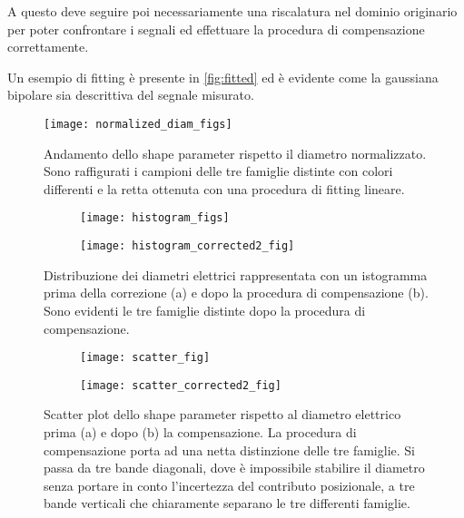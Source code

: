 A questo deve seguire poi necessariamente una riscalatura nel dominio originario per poter confrontare i segnali ed effettuare la procedura di compensazione correttamente.

Un esempio di fitting è presente in \cref{fig:fitted} ed è evidente come la gaussiana bipolare sia descrittiva del segnale misurato.

\begin{figure}[t!]
	\centering
	\texttt{[image: normalized\_diam\_figs]}
	\caption{Andamento dello shape parameter rispetto il diametro normalizzato. Sono raffigurati i campioni delle tre famiglie distinte con colori differenti e la retta ottenuta con una procedura di fitting lineare.}
	\label{fig:normalized}
\end{figure}

\begin{figure*}[t!]
	\centering
	\begin{subfigure}{0.5\linewidth}
		\centering
		\texttt{[image: histogram\_figs]}
		\caption{}
		\label{fig:histo}
	\end{subfigure}\hfill
	\begin{subfigure}{0.5\linewidth}
		\centering
		\texttt{[image: histogram\_corrected2\_fig]}
		\caption{}
	\end{subfigure}
	\caption{Distribuzione dei diametri elettrici rappresentata con un istogramma prima della correzione (a) e dopo la procedura di compensazione (b). Sono evidenti le tre famiglie distinte dopo la procedura di compensazione.}
	\label{fig:histogram}
	\vspace{0.5cm}
	\centering
	\begin{subfigure}{0.5\linewidth}
		\centering
		\texttt{[image: scatter\_fig]}
		\caption{}
		\label{fig:scatter_init}
	\end{subfigure}\hfill
	\begin{subfigure}{0.5\linewidth}
		\centering
		\texttt{[image: scatter\_corrected2\_fig]}
		\caption{}
	\end{subfigure}
	\caption{Scatter plot dello shape parameter rispetto al diametro elettrico prima (a) e dopo (b) la compensazione. La procedura di compensazione porta ad una netta distinzione delle tre famiglie. Si passa da tre bande diagonali, dove è impossibile stabilire il diametro senza portare in conto l'incertezza del contributo posizionale, a tre bande verticali che chiaramente separano le tre differenti famiglie. }
	\label{fig:scatter}
		\vspace{0.5cm}

\end{figure*}

